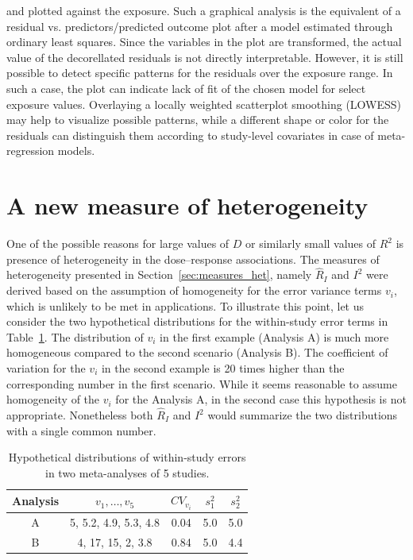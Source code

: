 \documentclass[11pt,a4paper,twoside,openany]{book}\usepackage{knitr}
\begin{document}
{\noindent and plotted against the exposure. Such a graphical analysis is the equivalent of a residual vs. predictors/predicted outcome plot after a model estimated through ordinary least squares. Since the variables in the plot are transformed, the actual value of the decorellated residuals is not directly interpretable. However, it is still possible to detect specific patterns for the residuals over the exposure range. In such a case, the plot can indicate lack of fit of the chosen model for select exposure values. Overlaying a locally weighted scatterplot smoothing (LOWESS) may help to visualize possible patterns, while a different shape or color for the residuals can distinguish them according to study-level covariates in case of meta-regression models.



\section{A new measure of heterogeneity}\label{sec:Rb}

One of the possible reasons for large values of $D$ or similarly small values of $R^2$ is presence of heterogeneity in the dose--response associations. The measures of heterogeneity presented in Section~\ref{sec:measures_het}, namely $\hat R_I$ and $I^2$ were derived based on the assumption of homogeneity for the error variance terms $v_i$, which is unlikely to be met in applications. To illustrate this point, let us consider the two hypothetical distributions for the within-study error terms in Table~\ref{tab:hyp_vi}. The distribution of $v_i$ in the first example (Analysis A) is much more homogeneous compared to the second scenario (Analysis B). The coefficient of variation for the $v_i$ in the second example is 20 times higher than the corresponding number in the first scenario. While it seems reasonable to assume homogeneity of the $v_i$ for the Analysis A, in the second case this hypothesis is not appropriate. Nonetheless both $\hat R_I$ and $I^2$ would summarize the two distributions with a single common number. 

\begin{table}[ht]
\centering
\caption{Hypothetical distributions of within-study errors 
in two meta-analyses of 5 studies.} 
\label{tab:hyp_vi}
\begin{tabular}{ccccc}
  \hline
Analysis & $v_1, \dots, v_5$ & $CV_{v_i}$ & $s_1^2$ & $s_2^2$ \\ 
  \hline
A & 5, 5.2, 4.9, 5.3, 4.8 & 0.04 & 5.0 & 5.0 \\ 
  B & 4, 17, 15, 2, 3.8 & 0.84 & 5.0 & 4.4 \\ 
   \hline
\end{tabular}
\end{table}


}
\end{document}
